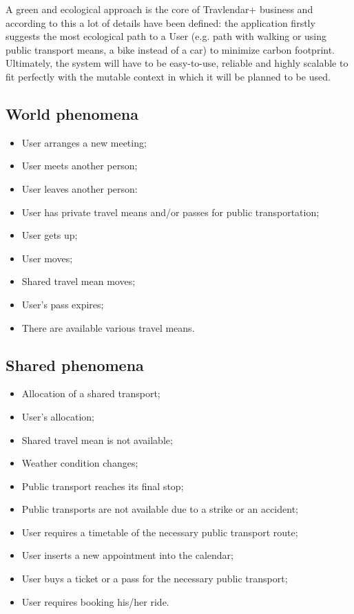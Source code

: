 \documentclass[a4paper,leqno]{book}
\begin{document}
A green and ecological approach is the core of Travlendar+ business and according to this a lot of details have been defined:  the application firstly suggests the most ecological path to a User (e.g. path with walking or using public transport means, a bike instead of a car) to minimize carbon footprint. 
Ultimately, the system will have to be easy-to-use, reliable and highly scalable to fit perfectly  with the mutable context in which it will be planned to be used.


\subsection{World phenomena}

\begin{itemize}
	\item User arranges a new meeting;
	\item User meets another person;
	\item User leaves another person:
	\item User has private travel means and/or passes for public transportation;
	\item User gets up;
	\item User moves;
	\item Shared travel mean moves;
	\item User's pass expires; 
	\item There are available various travel means.
\end{itemize}

\subsection{Shared phenomena}

\begin{itemize}
	\item Allocation of a  shared transport;
	\item User's allocation;
	\item Shared travel mean is not available;
	\item Weather condition changes;
	\item Public transport reaches its final stop;
	\item Public transports are not available due to a strike or an accident;
	\item User requires a timetable of the necessary public transport route;
	\item User inserts a new appointment into the calendar;
	\item User buys a ticket or a pass for the necessary public transport;
	\item User requires booking his/her ride.	 
\end{itemize}
\end{document}
